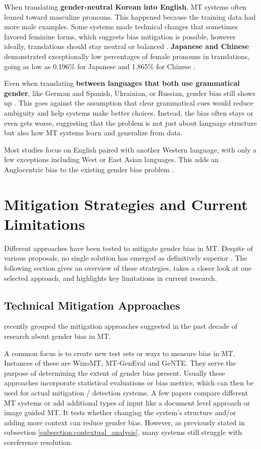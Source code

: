 When translating \textbf{gender-neutral Korean into English}, MT systems often leaned toward masculine pronouns. This happened because the training data had more male examples. Some systems made technical changes that sometimes favored feminine forms, which suggests bias mitigation is possible, however ideally, translations should stay neutral or balanced \citep{choMeasuringGenderBias2019}. \textbf{Japanese and Chinese} demonstrated exceptionally low percentages of female pronouns in translations, going as low as 0.196\% for Japanese and 1.865\% for Chinese \citep{pratesAssessingGenderBias2019}.

Even when translating \textbf{between languages that both use grammatical gender}, like German and Spanish, Ukrainian, or Russian, gender bias still shows up \citep{kapplAreAllSpanish2025}. This goes against the assumption that clear grammatical cues would reduce ambiguity and help systems make better choices. Instead, the bias often stays or even gets worse, suggesting that the problem is not just about language structure but also how MT systems learn and generalize from data.

Most studies focus on English paired with another Western language, with only a few exceptions including West or East Asian languages. This adds an Anglocentric bias to the existing gender bias problem \citep{savoldiDecadeGenderBias2025}.


\section{Mitigation Strategies and Current Limitations}    

Different approaches have been tested to mitigate gender bias in MT. Despite of various proposals, no single solution has emerged as definitively superior \citep{savoldiDecadeGenderBias2025}. The following section gives an overview of these strategies, takes a closer look at one selected approach, and highlights key limitations in current research.

\subsection{Technical Mitigation Approaches}
\citet{savoldiDecadeGenderBias2025} recently grouped the mitigation approaches suggested in the past decade of research about gender bias in MT. 

A common focus is to create new test sets or ways to measure bias in MT. Instances of these are WinoMT, MT-GenEval and GeNTE. They serve the purpose of determining the extent of gender bias present. Usually these approaches incorporate statistical evaluations or bias metrics, which can then be used for actual mitigation / detection systems. A few papers compare different MT systems or add additional types of input like a document level approach or image guided MT. It tests whether changing the system's structure and/or adding more context can reduce gender bias. However, as previously stated in subsection \ref{subsection:contextual_analysis}, many systems still struggle with coreference resolution.

